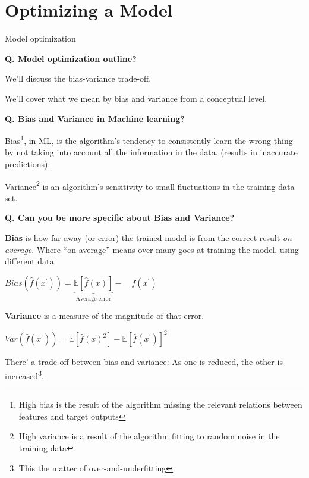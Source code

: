 \section{Optimizing a Model}
\begin{transitionframe}
  \begin{center}
    \Huge Model optimization
  \end{center}
\end{transitionframe}

\begin{frame}[fragile]{\textbf{Q. Model optimization outline?}}
  \begin{wideitemize}
    \item We'll discuss the bias-variance trade-off.
    \item We'll cover what we mean by bias and variance from a conceptual level.
  \end{wideitemize}
\end{frame}

\begin{frame}[fragile]{\textbf{Q. Bias and Variance in Machine learning?}}
  \begin{wideitemize}
    \item Bias\footnote{High bias is the result of the algorithm missing the
    relevant relations between features and target outputs}, in ML, is the algorithm's
    tendency to consistently learn the wrong thing by not taking into account
    all the information in the data. (results in inaccurate predictions).
    \item Variance\footnote{High variance is a result of the algorithm fitting to
    random noise in the training data} is an algorithm's sensitivity
    to small fluctuations in the training data set.
  \end{wideitemize}
\end{frame}

\begin{frame}[fragile]{\textbf{Q. Can you be more specific about Bias and Variance?}}
  \begin{wideitemize}
    \item \textbf{Bias} is how far away (or error) the trained model is from the correct
    result \textit{on average}. Where ``on average'' means over many goes at
    training the model, using different data:
    \begin{wideitemize}
    \item $Bias(\hat{f}(x^{'})) = \underbrace{\mathbb{E}[\hat{f}(x)]}_{\text{Average error}} - \quad f(x^{'})$
    \end{wideitemize}
    \item \textbf{Variance} is a measure of the magnitude of that error.
    \begin{wideitemize}
    \item $Var(\hat{f}(x^{'})) = \mathbb{E}[\hat{f}(x)^{2}] - \mathbb{E}[\hat{f}(x^{'})]^{2}$
    \end{wideitemize}
    \item There' a trade-off between bias and variance: As one is reduced,
    the other is increased\footnote{This the matter of over-and-underfitting}.
  \end{wideitemize}
\end{frame}

